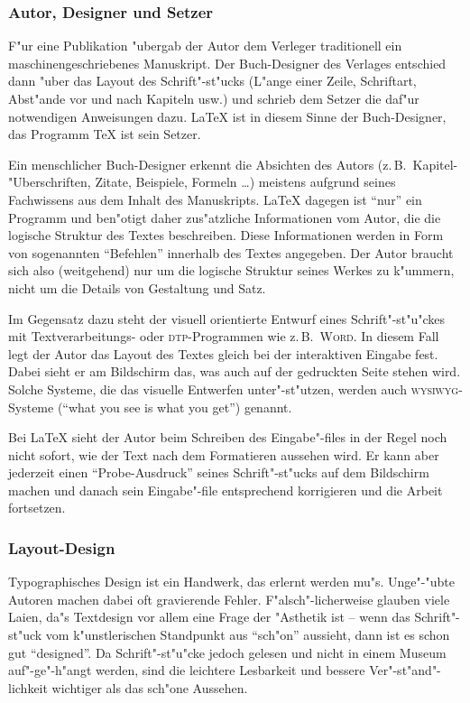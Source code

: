 \subsubsection{Autor, Designer und Setzer}
 
F"ur eine Publikation "ubergab der Autor dem Verleger
traditionell  ein maschinengeschriebenes Manuskript.  Der
Buch-Designer des Verlages entschied dann "uber das Layout des
Schrift"-st"ucks (L"ange einer Zeile, Schriftart, Ab\-st"ande vor
und nach Kapiteln usw.\@) und schrieb dem Setzer die
daf"ur notwendigen Anweisungen dazu.
\LaTeX{} ist in diesem Sinne der Buch-Designer, 
das Programm \TeX{} ist sein Setzer.
 
Ein menschlicher Buch-Designer erkennt die Absichten des Autors
(z.\,B.\ Kapitel-"Uberschriften, Zitate, Beispiele, Formeln
\dots) meistens aufgrund seines Fachwissens aus dem Inhalt des
Manuskripts.  \LaTeX{} dagegen ist "`nur"' ein Programm und
ben"otigt daher zus"atzliche Informationen vom Autor, die die
logische Struktur des Textes beschreiben.
Diese Informationen werden in Form von sogenannten "`Befehlen"'
innerhalb des Textes angegeben.
Der Autor braucht sich also
(weitgehend) nur um die logische Struktur seines Werkes zu k"ummern,
nicht um die Details von Gestaltung und Satz.
 
Im Gegensatz dazu steht der visuell orientierte Entwurf eines
Schrift"-st"u"ckes mit Textverarbeitungs- oder \textsc{dtp}-Programmen wie z.\,B.\ 
\textsc{Word}.
In diesem Fall legt der Autor das Layout des Textes gleich bei der
interaktiven Eingabe fest. Dabei sieht er am Bildschirm das, was
auch auf der gedruckten Seite stehen wird. Solche Systeme, die das
visuelle Entwerfen unter"-st"utzen, werden auch \textsc{wysiwyg}-Systeme
("`what you see is what you get"') genannt.
 
Bei \LaTeX{} sieht der Autor beim Schreiben des Eingabe"-files in
der Regel noch nicht sofort, wie der Text nach dem Formatieren 
aussehen wird. Er kann aber %
jederzeit einen "`Probe-Ausdruck"' seines Schrift"-st"ucks auf dem
Bildschirm machen und danach sein Eingabe"-file entsprechend 
korrigieren und die Arbeit fortsetzen.
 
 
\subsubsection{Layout-Design}
 
Typographisches Design ist ein Handwerk, das erlernt werden mu"s.
Unge"-"ubte Autoren machen dabei oft gravierende Fehler.
F"alsch"-licherweise glauben viele Laien, da"s Textdesign
vor allem eine Frage der "Asthetik ist -- wenn das
Schrift"-st"uck vom k"unstlerischen Standpunkt aus "`sch"on"'
aussieht, dann ist es schon gut "`designed"'.
Da Schrift"-st"u"cke jedoch gelesen und nicht in einem Museum
auf"-ge"-h"angt werden, sind die leichtere Lesbarkeit und bessere
Ver"-st"and"-lichkeit wichtiger als das sch"one Aussehen.
 
